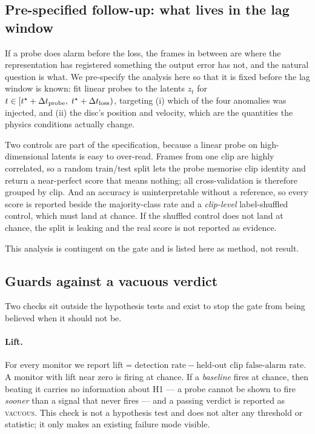 \subsection{Pre-specified follow-up: what lives in the lag window}
\label{sec:mech}

If a probe does alarm before the loss, the frames in between are where the
representation has registered something the output error has not, and the
natural question is what. We pre-specify the analysis here so that it is fixed
before the lag window is known: fit linear probes to the latents $z_t$ for
$t \in [t^\star + \Delta t_{\text{probe}},\; t^\star + \Delta t_{\text{loss}})$, targeting
(i) which of the four anomalies was injected, and (ii) the disc's position and
velocity, which are the quantities the physics conditions actually change.

Two controls are part of the specification, because a linear probe on
high-dimensional latents is easy to over-read. Frames from one clip are highly
correlated, so a random train/test split lets the probe memorise clip identity
and return a near-perfect score that means nothing; all cross-validation is
therefore grouped by clip. And an accuracy is uninterpretable without a
reference, so every score is reported beside the majority-class rate and a
\emph{clip-level} label-shuffled control, which must land at chance. If the
shuffled control does not land at chance, the split is leaking and the real
score is not reported as evidence.

This analysis is contingent on the gate and is listed here as method, not
result.

\subsection{Guards against a vacuous verdict}

Two checks sit outside the hypothesis tests and exist to stop the gate from
being believed when it should not be.

\paragraph{Lift.} For every monitor we report
$\text{lift} = \text{detection rate} - \text{held-out clip false-alarm rate}$.
A monitor with lift near zero is firing at chance. If a \emph{baseline} fires at
chance, then beating it carries no information about H1 --- a probe cannot be shown to fire
\emph{sooner} than a signal that never fires --- and a passing
verdict is reported as \textsc{vacuous}. This check is not a hypothesis test and
does not alter any threshold or statistic; it only makes an existing failure
mode visible.

